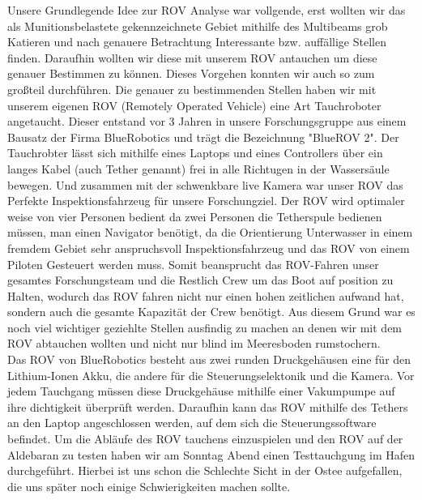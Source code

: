 
Unsere Grundlegende Idee zur ROV Analyse war vollgende, erst wollten wir das als Munitionsbelastete gekennzeichnete Gebiet mithilfe 
des Multibeams grob Katieren und nach genauere Betrachtung 
Interessante bzw. auffällige Stellen finden. Daraufhin wollten wir diese mit unserem ROV antauchen um diese genauer Bestimmen zu können.
Dieses Vorgehen konnten wir auch so zum großteil durchführen.
Die genauer zu bestimmenden Stellen haben wir mit unserem eigenen ROV (Remotely Operated Vehicle) eine Art Tauchroboter angetaucht. 
Dieser entstand vor 3 Jahren in unsere Forschungsgruppe aus einem Bausatz der Firma BlueRobotics und trägt die Bezeichnung "BlueROV 2".
Der Tauchrobter lässt sich mithilfe eines Laptops und eines Controllers über ein langes Kabel (auch Tether genannt) frei in alle Richtugen in der Wassersäule bewegen.
Und zusammen mit der schwenkbare live Kamera war unser ROV das Perfekte Inspektionsfahrzeug für unsere Forschungziel. Der ROV wird optimaler weise 
von vier Personen bedient da zwei Personen die Tetherspule bedienen müssen, man einen Navigator benötigt, da die Orientierung Unterwasser in einem fremdem Gebiet sehr anspruchsvoll Inspektionsfahrzeug und das ROV von einem Piloten Gesteuert werden muss.
Somit beansprucht das ROV-Fahren unser gesamtes Forschungsteam und die Restlich Crew um das Boot auf position zu Halten, wodurch das ROV fahren nicht nur einen hohen zeitlichen aufwand hat, sondern auch die gesamte Kapazität der Crew benötigt.
Aus diesem Grund war es noch viel wichtiger geziehlte Stellen ausfindig zu machen an denen wir mit dem ROV abtauchen wollten und nicht nur blind im Meeresboden rumstochern.
\\

Das ROV von BlueRobotics besteht aus zwei runden Druckgehäusen eine für den Lithium-Ionen Akku, die andere für die Steuerungselektonik und die Kamera.
Vor jedem Tauchgang müssen diese Druckgehäuse mithilfe einer Vakumpumpe auf ihre dichtigkeit überprüft werden. 
Daraufhin kann das ROV mithilfe des Tethers an den Laptop angeschlossen werden, auf dem sich die Steuerungssoftware befindet.
Um die Abläufe des ROV tauchens einzuspielen und den ROV auf der Aldebaran zu testen haben wir am Sonntag Abend einen Testtauchgung im Hafen durchgeführt. 
Hierbei ist uns schon die Schlechte Sicht in der Ostee aufgefallen, die uns später noch einige Schwierigkeiten machen sollte.
\\

